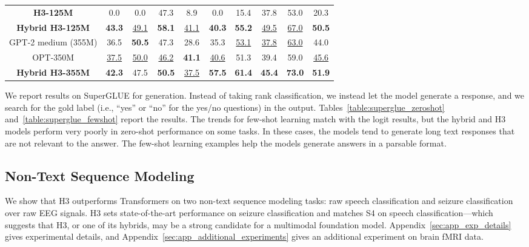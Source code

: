 \documentclass{article}
\newcommand{\hthree}{\textsc{H3}\xspace}
\begin{document}
\begin{table}[h]
{\begin{tabular}{@{}|c|cccccccc|c|@{}}
        \textbf{\hthree-125M} & 0.0 & 0.0 & 47.3 & 8.9 & 0.0 & 15.4 & 37.8 & 53.0 & 20.3 \\ \textbf{Hybrid \hthree-125M} & \textbf{43.3} & \underline{49.1} & \textbf{58.1} & \underline{41.1} & \textbf{40.3} & \textbf{55.2} & \underline{49.5} & \underline{67.0} & \textbf{50.5} \\ \hline GPT-2 medium (355M) & 36.5 & \textbf{50.5} & 47.3 & 28.6 & 35.3 & \underline{53.1} & \underline{37.8} & \underline{63.0} & 44.0 \\
OPT-350M & \underline{37.5} & \underline{50.0} & \underline{46.2} & \textbf{41.1} & \underline{40.6} & 51.3 & 39.4 & 59.0 & \underline{45.6} \\
        \textbf{Hybrid \hthree-355M} & \textbf{42.3} & 47.5 & \textbf{50.5} & \underline{37.5} & \textbf{57.5} & \textbf{61.4} & \textbf{45.4} & \textbf{73.0} & \textbf{51.9} \\ \hline
\end{tabular}
    }
\end{table} We report results on SuperGLUE for generation.
Instead of taking rank classification, we instead let the model generate a response, and we search for the gold label (i.e., ``yes'' or ``no'' for the yes/no questions) in the output.
Tables~\ref{table:superglue_zeroshot} and~\ref{table:superglue_fewshot} report the results.
The trends for few-shot learning match with the logit results, but the hybrid and \hthree models perform very poorly in zero-shot performance on some tasks.
In these cases, the models tend to generate long text responses that are not relevant to the answer.
The few-shot learning examples help the models generate answers in a parsable format.

\subsection{Non-Text Sequence Modeling}
\label{subsec:non_text_sequence_modeling}

We show that \hthree outperforms Transformers on two non-text sequence modeling tasks: raw speech classification and seizure classification over raw EEG signals.
\hthree sets state-of-the-art performance on seizure classification and matches S4 on speech classification---which suggests that \hthree, or one of its hybrids, may be a strong candidate for a multimodal foundation model.
Appendix~\ref{sec:app_exp_details} gives experimental details, and Appendix~\ref{sec:app_additional_experiments} gives an additional experiment on brain fMRI data.
\end{document}
